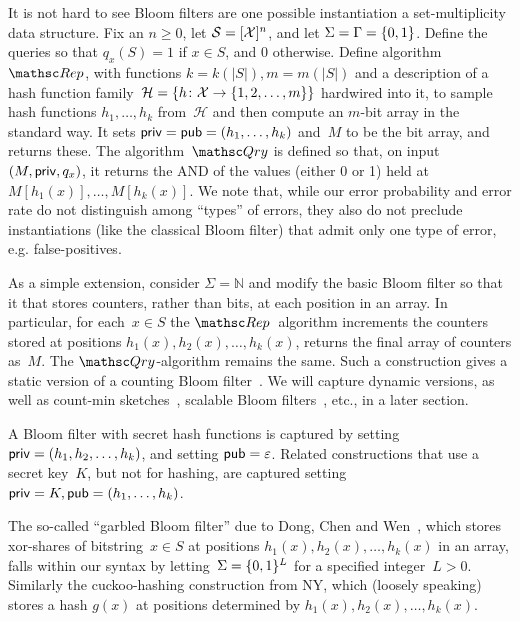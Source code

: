 It is not hard to see Bloom filters are one possible instantiation a
set-multiplicity data structure. Fix an $n \geq 0$, let
$\mathcal{S}=[{\cal X}]^n$, and let $\Sigma=\Gamma=\{0,1\}$. Define the
queries so that $q_x(S)=1$ if $x \in S$, and 0 otherwise.  Define
algorithm~$\Rep$, with functions $k=k(|S|), m=m(|S|)$ and a
description of a hash function family~$\mathcal{H}=\{h \colon {\cal X}
\to \{1,2,\ldots,m\}\}$ hardwired into it, to sample hash functions
$h_1, \ldots, h_k$ from~$\mathcal{H}$ and then compute an $m$-bit
array in the standard way.  It sets ${\sf priv}={\sf pub} = (h_1,
\ldots, h_k)$ and~$M$ to be the bit array, and returns these.  The
algorithm~$\Qry$ is defined so that, on input $(M,{\sf priv},q_x)$, it
returns the AND of the values (either 0 or 1) held at
$M[h_1(x)],\ldots,M[h_k(x)]$.  We note that, while our error
probability and error rate do not distinguish among ``types'' of
errors, they also do not preclude instantiations (like the classical
Bloom filter) that admit only one type of error, e.g.
false-positives.

As a simple extension, consider $\Sigma=\mathbb{N}$ and modify the
basic Bloom filter so that it that stores counters, rather than
bits, at each position in an array.  In particular, for each~$x \in
S$ the $\Rep$~algorithm increments the counters stored at positions
$h_1(x), h_2(x), \ldots, h_k(x)$, returns the final array of
counters as~$M$.  The $\Qry$-algorithm remains the same. Such a
construction gives a static version of a counting Bloom
filter~\cite{xxx}.  We will capture dynamic versions, as well as
count-min sketches~\cite{xxx}, scalable Bloom filters~\cite{xxx},
etc., in a later section.

A Bloom filter with secret hash functions is captured by setting ${\sf priv}=(h_1,h_2,\ldots,h_k)$, and setting ${\sf pub}=\varepsilon$.  Related constructions  that use a secret key~$K$, but not for hashing, are captured setting ${\sf priv}=K, {\sf pub}=(h_1, \ldots, h_k)$.

The so-called ``garbled Bloom filter'' due to Dong, Chen and Wen~\cite{xxx}, which stores xor-shares of bitstring~$x \in S$ at positions $h_1(x),h_2(x),\ldots,h_k(x)$ in an array, falls within our syntax by letting~$\Sigma=\{0,1\}^L$ for a specified integer~$L>0$.  Similarly the cuckoo-hashing construction from NY, which (loosely speaking) stores a hash $g(x)$ at positions determined by $h_1(x),h_2(x),\ldots,h_k(x)$. 
